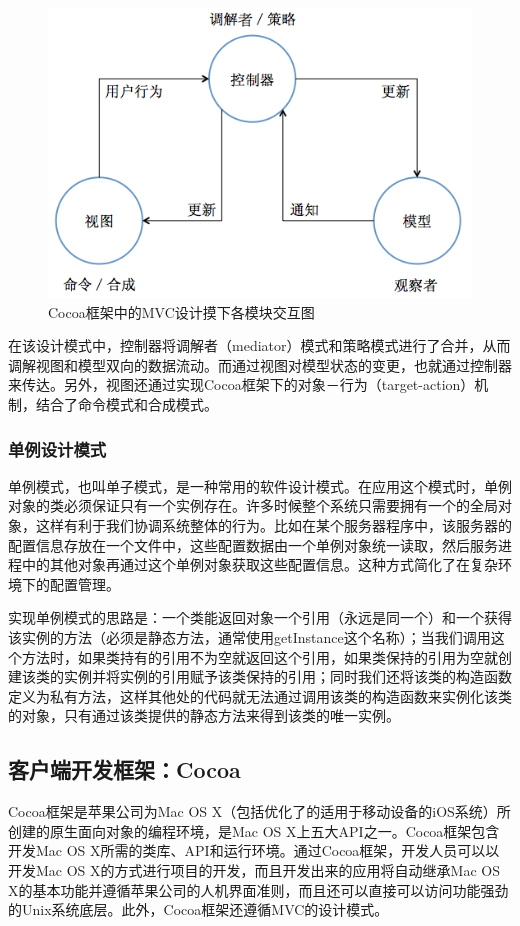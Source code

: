 \documentclass{article}
\begin{document}
\begin{CJK}{UTF8}{gbsn}
  \begin{figure}[htbp]
		\centering
		\includegraphics[bb=0 0 510 359, scale=0.45]{figure/fig_n02.png}
		\caption{Cocoa框架中的MVC设计摸下各模块交互图}
		\label{fig:n02}
	\end{figure}

  在该设计模式中，控制器将调解者（mediator）模式和策略模式进行了合并，从而调解视图和模型双向的数据流动。而通过视图对模型状态的变更，也就通过控制器来传达。另外，视图还通过实现Cocoa框架下的对象－行为（target-action）机制，结合了命令模式和合成模式。\cite{iOSLIB} 

	\subsubsection{单例设计模式}
  单例模式，也叫单子模式，是一种常用的软件设计模式。在应用这个模式时，单例对象的类必须保证只有一个实例存在。许多时候整个系统只需要拥有一个的全局对象，这样有利于我们协调系统整体的行为。比如在某个服务器程序中，该服务器的配置信息存放在一个文件中，这些配置数据由一个单例对象统一读取，然后服务进程中的其他对象再通过这个单例对象获取这些配置信息。这种方式简化了在复杂环境下的配置管理。

  实现单例模式的思路是：一个类能返回对象一个引用（永远是同一个）和一个获得该实例的方法（必须是静态方法，通常使用getInstance这个名称）；当我们调用这个方法时，如果类持有的引用不为空就返回这个引用，如果类保持的引用为空就创建该类的实例并将实例的引用赋予该类保持的引用；同时我们还将该类的构造函数定义为私有方法，这样其他处的代码就无法通过调用该类的构造函数来实例化该类的对象，只有通过该类提供的静态方法来得到该类的唯一实例。\cite{WIKI}

	\subsection{客户端开发框架：Cocoa}
  Cocoa框架是苹果公司为Mac OS X（包括优化了的适用于移动设备的iOS系统）所创建的原生面向对象的编程环境，是Mac OS X上五大API之一。Cocoa框架包含开发Mac OS X所需的类库、API和运行环境。通过Cocoa框架，开发人员可以以开发Mac OS X的方式进行项目的开发，而且开发出来的应用将自动继承Mac OS X的基本功能并遵循苹果公司的人机界面准则，而且还可以直接可以访问功能强劲的Unix系统底层\cite{Cocoa}。此外，Cocoa框架还遵循MVC的设计模式。


\end{CJK}
\end{document}
